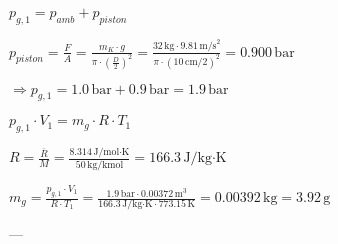 \( p_{g,1} = p_{amb} + p_{piston} \)  

\( p_{piston} = \frac{F}{A} = \frac{m_K \cdot g}{\pi \cdot \left( \frac{D}{2} \right)^2} = \frac{32 \, \text{kg} \cdot 9.81 \, \text{m/s}^2}{\pi \cdot \left( 10 \, \text{cm} / 2 \right)^2} = 0.900 \, \text{bar} \)  

\( \Rightarrow p_{g,1} = 1.0 \, \text{bar} + 0.9 \, \text{bar} = 1.9 \, \text{bar} \)  

\( p_{g,1} \cdot V_1 = m_g \cdot R \cdot T_1 \)  

\( R = \frac{\overline{R}}{M} = \frac{8.314 \, \text{J/mol·K}}{50 \, \text{kg/kmol}} = 166.3 \, \text{J/kg·K} \)  

\( m_g = \frac{p_{g,1} \cdot V_1}{R \cdot T_1} = \frac{1.9 \, \text{bar} \cdot 0.00372 \, \text{m}^3}{166.3 \, \text{J/kg·K} \cdot 773.15 \, \text{K}} = 0.00392 \, \text{kg} = 3.92 \, \text{g} \)  

---